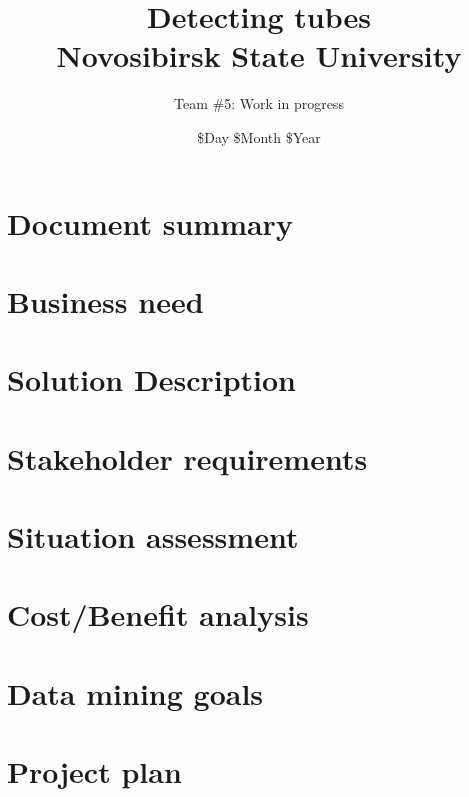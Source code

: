 \documentclass[14pt]{report}
\title{
	{Detecting tubes} \\ %
	{\large Novosibirsk State University} \\
}
\author{Team \#5: Work in progress}
\date{\$Day \$Month \$Year}
\begin{document}
	
\maketitle
\tableofcontents


\chapter{Document summary}

\thispagestyle{fancy}


\chapter{Business need}

\thispagestyle{fancy}


\chapter{Solution Description}
\thispagestyle{fancy}


\chapter{Stakeholder requirements}

\thispagestyle{fancy}


\chapter{Situation assessment}

\thispagestyle{fancy}


\chapter{Cost/Benefit analysis}

\thispagestyle{fancy}


\chapter{Data mining goals}

\thispagestyle{fancy}


\chapter{Project plan}

\thispagestyle{fancy}

\end{document}
